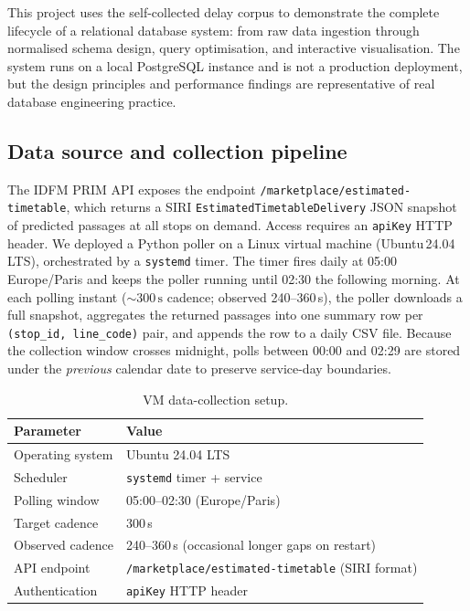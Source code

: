 \documentclass[a4paper,11pt]{article}
\begin{document}
This project uses the self-collected delay corpus to demonstrate the complete lifecycle of a
relational database system: from raw data ingestion through normalised schema design,
query optimisation, and interactive visualisation.
The system runs on a local PostgreSQL instance and is not a production deployment, but
the design principles and performance findings are representative of real database
engineering practice.

\subsection{Data source and collection pipeline}

The IDFM PRIM API exposes the endpoint
\texttt{/marketplace/estimated-timetable}, which returns a SIRI
\texttt{EstimatedTimetableDelivery} JSON snapshot of predicted passages at all stops
on demand.
Access requires an \texttt{apiKey} HTTP header.
We deployed a Python poller on a Linux virtual machine (Ubuntu\,24.04\,LTS),
orchestrated by a \texttt{systemd} timer.
The timer fires daily at 05:00 Europe/Paris and keeps the poller running until 02:30
the following morning.
At each polling instant (${\sim}300\,\text{s}$ cadence; observed 240–360\,s), the
poller downloads a full snapshot, aggregates the returned passages into one summary
row per \texttt{(stop\_id, line\_code)} pair, and appends the row to a daily CSV
file.
Because the collection window crosses midnight, polls between 00:00 and 02:29 are
stored under the \emph{previous} calendar date to preserve service-day boundaries.

\begin{table}[H]
\centering
\small
\begin{tabular}{ll}
\toprule
\textbf{Parameter} & \textbf{Value} \\
\midrule
Operating system    & Ubuntu 24.04 LTS \\
Scheduler           & \texttt{systemd} timer + service \\
Polling window      & 05:00–02:30 (Europe/Paris) \\
Target cadence      & 300\,s \\
Observed cadence    & 240–360\,s (occasional longer gaps on restart) \\
API endpoint        & \texttt{/marketplace/estimated-timetable} (SIRI format) \\
Authentication      & \texttt{apiKey} HTTP header \\
\bottomrule
\end{tabular}
\caption{VM data-collection setup.}
\label{tab:vm-setup}
\end{table}
\end{document}
